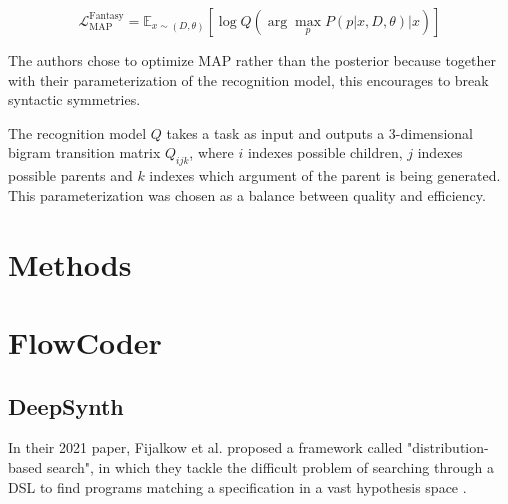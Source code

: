 \[
    \mathcal{L}_{\text{MAP}}^{\text{Fantasy}} = \mathbb{E}_{x \sim (D, \theta)} \left[ \log Q \left( \arg\max_{p} P(p|x, D, \theta) \Big\lvert x \right) \right]  
\]

The authors chose to optimize MAP rather than the posterior because together with their parameterization of the recognition model, this encourages to break syntactic symmetries.

The recognition model \(Q\) takes a task as input and outputs a 3-dimensional bigram transition matrix \(Q_{ijk}\), where \(i\) indexes possible children, \(j\) indexes possible parents and \(k\) indexes which argument of the parent is being generated. This parameterization was chosen as a balance between quality and efficiency.








\section{Methods}
\section{FlowCoder}




\subsection{DeepSynth}

In their 2021 paper, Fijalkow et al. proposed a framework called "distribution-based search", in which they tackle the difficult problem of searching through a DSL to find programs matching a specification in a vast hypothesis space \cite{fijalkow_scaling_2021}.

